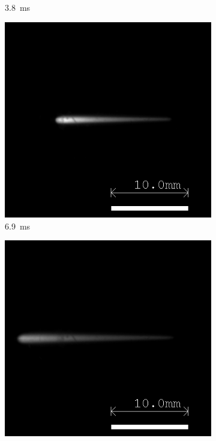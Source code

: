 \begin{figure}[h]
\begin{subfigure}[t]{0.3\textwidth}
        \caption{\qty{3.8}{ms}}
    \end{subfigure}
    \hfill
    \begin{subfigure}[t]{0.3\textwidth}
        \centering
        \includegraphics[width=\textwidth]{assets/4 experiments/V1 Spark Ignition Frames/LSP142_SPRK15_Fr69.bmp}
        \caption{\qty{6.9}{ms}}
    \end{subfigure}
    \hfill
    \begin{subfigure}[t]{0.3\textwidth}
        \centering
        \includegraphics[width=\textwidth]{assets/4 experiments/V1 Spark Ignition Frames/LSP142_SPRK15_Fr130.bmp}

\end{subfigure}
\end{figure}
